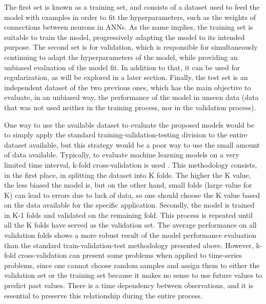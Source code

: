 The first set is known as a training set, and consists of a dataset used to feed the model with examples in order to fit the hyperparameters, such as the weights of connections between neurons in \ac{ANNs}. As the name implies, the training set is suitable to train the model, progressively adapting the model to its intended purpose. The second set is for validation, which is responsible for simultaneously continuing to adapt the hyperparameters of the model, while providing an unbiased evaluation of the model fit. In addition to that, it can be used for regularization, as will be explored in a later section. Finally, the test set is an independent dataset of the two previous ones, which has the main objective to evaluate, in an unbiased way, the performance of the model in unseen data (data that was not used neither in the training process, nor in the validation process). 

One way to use the available dataset to evaluate the proposed models would be to simply apply the standard training-validation-testing division to the entire dataset available, but this strategy would be a poor way to use the small amount of data available. Typically, to evaluate machine learning models on a very limited time interval, k-fold cross-validation is used \cite{kfold}. This methodology consists, in the first place, in splitting the dataset into K folds. The higher the K value, the less biased the model is, but on the other hand, small folds (large value for K) can lead to errors due to lack of data, so one should choose the K value based on the data available for the specific application. Secondly, the model is trained in K-1 folds and validated on the remaining fold. This process is repeated until all the K folds have served as the validation set. The average performance on all validation folds shows a more robust result of the model performance evaluation than the standard train-validation-test methodology presented above. However, k-fold cross-validation can present some problems when applied to time-series problems, since one cannot choose random samples and assign them to either the validation set or the training set because it makes no sense to use future values to predict past values. There is a time dependency between observations, and it is essential to preserve this relationship during the entire process. 


